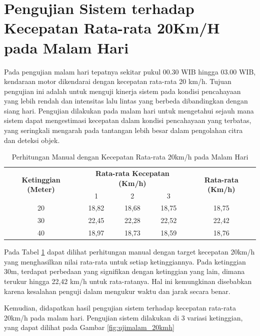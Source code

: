 \section{Pengujian Sistem terhadap Kecepatan Rata-rata 20Km/H pada Malam Hari}

Pada pengujian malam hari tepatnya sekitar pukul 00.30 WIB hingga 03.00 WIB, kendaraan motor dikendarai dengan kecepatan rata-rata 20 km/h. Tujuan pengujian ini adalah untuk menguji kinerja sistem pada kondisi pencahayaan yang lebih rendah dan intensitas lalu lintas yang berbeda dibandingkan dengan siang hari. Pengujian dilakukan pada malam hari untuk mengetahui sejauh mana sistem dapat mengestimasi kecepatan dalam kondisi pencahayaan yang terbatas, yang seringkali mengarah pada tantangan lebih besar dalam pengolahan citra dan deteksi objek.
\vspace{-10pt}
\begin{table}[H]
	\caption{Perhitungan Manual dengan Kecepatan Rata-rata 20km/h pada Malam Hari}
    \label{table:20km/h-malam-manual}
	\centering
	\begin{tabular}{|c|c|c|c|c|}
		\hline
		\multirow{2}{*}{\textbf{Ketinggian (Meter)}} & \multicolumn{3}{c|}{\textbf{Rata-rata Kecepatan (Km/h)}} & \multirow{2}{*}{\textbf{Rata-rata (Km/h)}} \\ \cline{2-4}
		& 1 & 2 & 3 & \\ \hline
		20 & 18,82 & 18,68 & 18,75 & 18,75 \\
		30 & 22,45 & 22,28 & 22,52 & 22,42 \\
		40 & 18,97 & 18,73 & 18,59 & 18,76 \\ \hline
	\end{tabular}
\end{table}
\vspace{-10pt}
Pada Tabel \ref{table:20km/h-malam-manual} dapat dilihat perhitungan manual dengan target kecepatan 20km/h yang menghasilkan nilai rata-rata untuk setiap ketinggiannya. Pada ketinggian 30m, terdapat perbedaan yang signifikan dengan ketinggian yang lain, dimana terukur hingga 22,42 km/h untuk rata-ratanya. Hal ini kemungkinan disebabkan karena kesalahan penguji dalam mengukur waktu dan jarak secara benar.

Kemudian, didapatkan hasil pengujian sistem terhadap kecepatan rata-rata 20km/h pada malam hari. Pengujian sistem dilakukan di 3 variasi ketinggian, yang dapat dilihat pada Gambar \ref{fig:ujimalam_20kmh}


